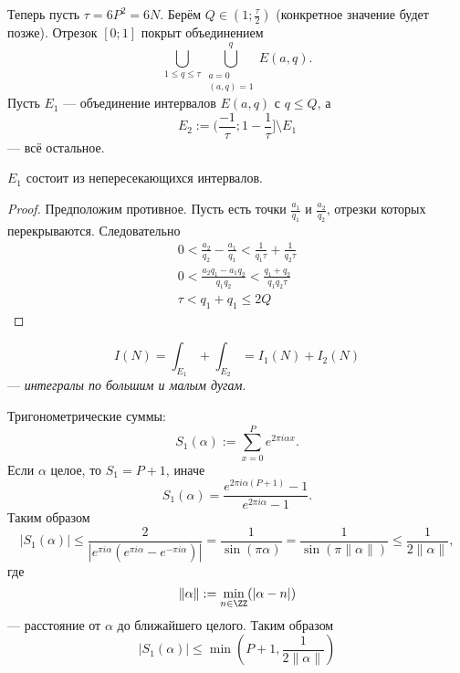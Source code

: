 \documentclass[12pt,a4paper]{article}
\begin{document}
    Теперь пусть $\tau = 6 P^2 = 6N$. Берём $Q \in (1; \frac{\tau}{2})$ (конкретное значение будет позже). Отрезок $[0; 1]$ покрыт объединением
    \[\bigcup_{1 \leqslant q \leqslant \tau} \bigcup_{\substack{a = 0\\ (a, q) = 1}}^q E(a, q).\]
    Пусть $E_1$ --- объединение интервалов $E(a, q)$ с $q \leqslant Q$, а
    \[E_2 := (\frac{-1}{\tau}; 1 - \frac{1}{\tau}] \setminus E_1\]
    --- всё остальное.

    \begin{theorem}
        $E_1$ состоит из непересекающихся интервалов.
    \end{theorem}

    \begin{proof}
        Предположим противное. Пусть есть точки $\frac{a_1}{q_1}$ и $\frac{a_2}{q_2}$, отрезки которых перекрываются. Следовательно
        \begin{gather*}
            0 < \frac{a_2}{q_2} - \frac{a_1}{q_1} < \frac{1}{q_1 \tau} + \frac{1}{q_2 \tau}\\
            0 < \frac{a_2 q_1 - a_1 q_2}{q_1 q_2} < \frac{q_1 + q_2}{q_1 q_2 \tau}\\
            \tau < q_1 + q_1 \leqslant 2Q
        \end{gather*}
    \end{proof}

    \[I(N) = \int_{E_1} + \int_{E_2} = I_1(N) + I_2(N)\]
    --- \emph{интегралы по большим и малым дугам}.

    Тригонометрические суммы:
    \[S_1(\alpha) := \sum_{x=0}^P e^{2 \pi i \alpha x}.\]
    Если $\alpha$ целое, то $S_1 = P+1$, иначе
    \[S_1(\alpha) = \frac{e^{2 \pi i \alpha (P+1)} - 1}{e^{2 \pi i \alpha} - 1}.\]
    Таким образом
    \[|S_1(\alpha)| \leqslant \frac{2}{|e^{\pi i \alpha}(e^{\pi i \alpha} - e^{-\pi i \alpha})|} = \frac{1}{\sin(\pi \alpha)} = \frac{1}{\sin(\pi \|\alpha\|)} \leqslant \frac{1}{2 \|\alpha\|},\]
    где
    \[\|\alpha\| := \min_{n \in \ZZ}(|\alpha - n|)\]
    --- расстояние от $\alpha$ до ближайшего целого. Таким образом
    \[|S_1(\alpha)| \leqslant \min\left(P+1, \frac{1}{2\|\alpha\|}\right)\]
\end{document}
